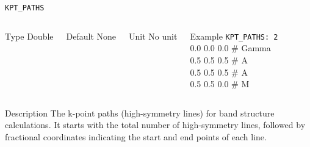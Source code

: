 \begin{frame}[allowframebreaks]{\texttt{KPT\_PATHS}} \label{KPT_PATHS}
\vspace*{-12pt}
\begin{columns}
\begin{block}{Type}
Double
\end{block}

\begin{block}{Default}
None
\end{block}

\begin{block}{Unit}
No unit
\end{block}

\begin{block}{Example}
\texttt{KPT\_PATHS: 2\\}
0.0 0.0 0.0 \# Gamma\\
0.5 0.5 0.5 \# A\\
0.5 0.5 0.5 \# A\\
0.5 0.5 0.0 \# M
\end{block}
\end{columns}

\begin{block}{Description}
The k-point paths (high-symmetry lines) for band structure calculations.  It starts with the total number of high-symmetry lines, followed by fractional coordinates indicating the start and end points of each line.
\end{block}

\end{frame}

